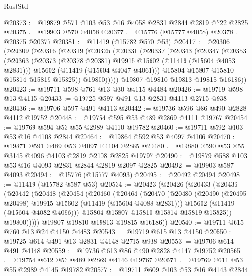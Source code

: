 \begin{lexlean}{RustStd}
\begin{coremodule}
@20373 := @19879 @571 @103 @53 @16 @4058 @2831 @2844 @2819 @722 @2825
@20375 := @19903 @570 @4058
@20377 := @15776 (@15777 @4058)
@20378 := @20375 @20377
@20381 := @11419 (@15782 @570 @53)
@20417 := @20306
    (@20309
      (@20316
        (@20319
          (@20325
            (@20331
              (@20337
                (@20343
                  (@20347
                    (@20353
                      (@20363
                        (@20373 (@20378 @20381) @19915 @15602 (@11419 (@15604 @4053 @2831)))
                        @15602
                        (@11419 (@15604 @4047 @4061)))
                      @15804
                      @15807
                      @15810
                      @15814
                      @15819
                      @15825))
                  @19800)))))
        @19807
        @19810
        @19813
        @19815
        @16186))
@20423 := @19711 @598 @761 @13 @30 @4115 @4484
@20426 := @19719 @598 @13 @4115
@20433 := @19725 @597 @491 @13 @2831 @4113 @2715 @938
@20436 := @19706 @597 @491 @4113
@20442 := @19736 @596 @86 @490 @2828 @4112 @19752
@20448 := @19754 @595 @53 @489 @2869 @4111 @19767
@20454 := @19769 @594 @53 @55 @2989 @4110 @19782
@20460 := @19711 @592 @103 @53 @16 @4108 @2844
@20464 := @19864 @592 @53 @4097 @4106
@20470 := @19871 @591 @489 @53 @4097 @4104 @2885
@20480 := @19880 @590 @53 @55 @3145 @4096 @4103 @2819 @2108 @2825 @19797
@20490 := @19879 @588 @103 @53 @16 @4093 @2831 @2844 @2819 @2097 @2825
@20492 := @19903 @587 @4093
@20494 := @15776 (@15777 @4093)
@20495 := @20492 @20494
@20498 := @11419 (@15782 @587 @53)
@20534 := @20423
    (@20426
      (@20433
        (@20436
          (@20442
            (@20448
              (@20454
                (@20460
                  (@20464
                    (@20470
                      (@20480
                        (@20490 (@20495 @20498) @19915 @15602 (@11419 (@15604 @4088 @2831)))
                        @15602
                        (@11419 (@15604 @4082 @4096)))
                      @15804
                      @15807
                      @15810
                      @15814
                      @15819
                      @15825))
                  @19800)))))
        @19807
        @19810
        @19813
        @19815
        @16186))
@20540 := @19711 @615 @760 @13 @24 @4150 @4483
@20543 := @19719 @615 @13 @4150
@20550 := @19725 @614 @491 @13 @2831 @4148 @2715 @938
@20553 := @19706 @614 @491 @4148
@20559 := @19736 @613 @86 @490 @2828 @4147 @19752
@20565 := @19754 @612 @53 @489 @2869 @4146 @19767
@20571 := @19769 @611 @53 @55 @2989 @4145 @19782
@20577 := @19711 @609 @103 @53 @16 @4143 @2844

\end{coremodule}
\end{lexlean}
